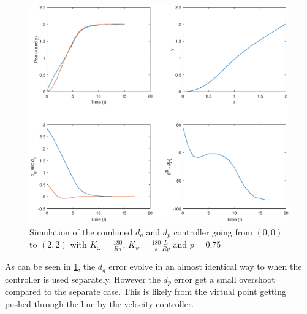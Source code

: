 \begin{figure}[H]
    \centering
    \includegraphics[width=\textwidth]{figs/perf-follow.eps}
    \caption{Simulation of the combined $d_g$ and $d_p$ controller going from $(0, 0)$ to $(2, 2)$ with $K_\omega = \frac{180}{R\pi}$, $K_\psi = \frac{180}{\pi} \frac{L}{Rp}$ and $p = 0.75$}\label{fig:perf-dg}
\end{figure}

As can be seen in \ref{fig:perf-dg}, the $d_g$ error evolve in an almost identical way to when the controller is used separately. However the $d_p$ error get a small overshoot compared to the separate case. This is likely from the virtual point getting pushed through the line by the velocity controller.